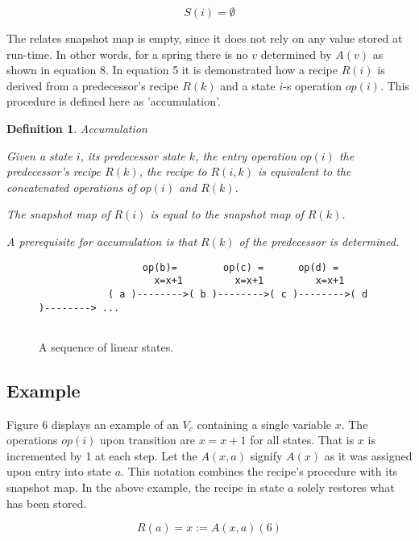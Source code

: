 \documentclass[12pt,a4paper]{scrartcl}
\theoremstyle{break}
\newtheorem{definition}{Definition}
\begin{document}
\begin{equation}
                          S(i) = \emptyset
\end{equation}

The relates snapshot map is empty, since it does not rely on any value stored
at run-time.  In other words, for a spring there is no $v$ determined by $A(v)$
as shown in equation 8.  In equation 5 it is demonstrated how a recipe $R(i)$
is derived from a predecessor's recipe $R(k)$ and a state $i$-s operation
$op(i)$. This procedure is defined here as 'accumulation'.

\begin{definition}
Accumulation

Given a state $i$, its predecessor state $k$, the entry operation $op(i)$
the predecessor's recipe $R(k)$, the recipe to $R(i,k)$ is equivalent
to the concatenated operations of $op(i)$ and $R(k)$.

The snapshot map of $R(i)$ is equal to the snapshot map of $R(k)$.

A prerequisite for accumulation is that $R(k)$ of the predecessor is 
determined.
\end{definition}

\begin{figure}[htbp] \leavevmode
\begin{verbatim}
                  op(b)=        op(c) =      op(d) =
                    x=x+1         x=x+1         x=x+1        
            ( a )-------->( b )-------->( c )-------->( d )--------> ...


\end{verbatim}
\caption{A sequence of linear states.}
\end{figure}

\subsection{Example}

Figure 6 displays an example of an $V_c$ containing a single variable $x$. The
operations $op(i)$ upon transition are $x=x+1$ for all states. That is $x$ is
incremented by 1 at each step. Let the $A(x,a)$ signify $A(x)$ as it was
assigned upon entry into state $a$. This notation combines the recipe's
procedure with its snapshot map. In the above example, the recipe in state $a$
solely restores what has been stored.

\begin{equation}
\label{eq:}
               R(a) = { x := A(x,a) }                                     (6)
\end{equation}
\end{document}
